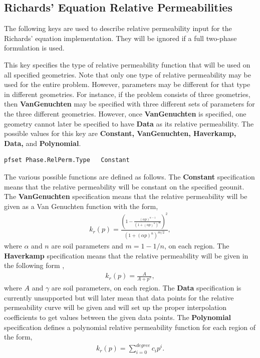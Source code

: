 \subsection{Richards' Equation Relative Permeabilities}
\label{Richards RelPerm}

The following keys are used to describe relative permeability input for the
Richards' equation implementation.  They will be ignored if a full two-phase
formulation is used.

{
This key specifies the type of relative permeability function that will be used
on all specified geometries.  Note that only one type of relative permeability
may be used for the entire problem.  However, parameters may be different for
that type in different geometries.  For instance, if the problem consists of
three geometries, then {\bf VanGenuchten} may be specified with three different
sets of parameters for the three different geometries.  However, once {\bf
VanGenuchten} is specified, one geometry cannot later be specified to have {\bf
Data} as its relative permeability.  The possible values for this key
are {\bf Constant, VanGenuchten, Haverkamp, Data,} and {\bf  Polynomial}.
}
\begin{display}\begin{verbatim}
pfset Phase.RelPerm.Type   Constant
\end{verbatim}\end{display}

The various possible functions are defined as follows.
The {\bf Constant} specification means that the relative permeability will be
constant on the specified geounit.  The {\bf VanGenuchten} specification means
that the relative permeability will be given as a Van Genuchten function
\cite{VanGenuchten80} with the form,
\begin{eqnarray}
k_r(p) = \frac{(1 - \frac{(\alpha p)^{n-1}}{(1 + (\alpha p)^n)^m})^2}
{(1 + (\alpha p)^n)^{m/2}},
\end{eqnarray}
where $\alpha$ and $n$ are soil parameters and $m = 1 - 1/n$, on each region.
The {\bf Haverkamp} specification means that the relative permeability will be
given in the following form \cite{Haverkamp-Vauclin81},
\begin{eqnarray}
k_r(p) = \frac{A}{A + p^{\gamma}},
\end{eqnarray}
where $A$ and $\gamma$ are soil parameters, on each region.
The {\bf Data} specification is currently unsupported but will later mean that
data points for the relative permeability curve will be given and \parflow{}
will set up the proper interpolation coefficients to get values between the
given data points.
The {\bf Polynomial} specification
defines a polynomial relative permeability function for each
region of the form,
\begin{eqnarray}
k_r(p) = \sum_{i=0}^{degree} c_ip^i.
\end{eqnarray}

